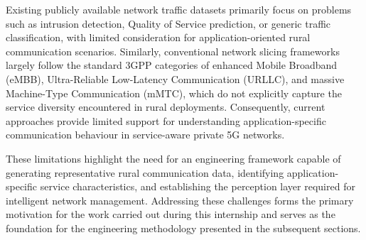 \documentclass[12pt,a4paper]{report}
\begin{document}
	Existing publicly available network traffic datasets primarily focus on problems such as intrusion detection, Quality of Service prediction, or generic traffic classification, with limited consideration for application-oriented rural communication scenarios. Similarly, conventional network slicing frameworks largely follow the standard 3GPP categories of enhanced Mobile Broadband (eMBB), Ultra-Reliable Low-Latency Communication (URLLC), and massive Machine-Type Communication (mMTC), which do not explicitly capture the service diversity encountered in rural deployments. Consequently, current approaches provide limited support for understanding application-specific communication behaviour in service-aware private 5G networks.
	
	These limitations highlight the need for an engineering framework capable of generating representative rural communication data, identifying application-specific service characteristics, and establishing the perception layer required for intelligent network management. Addressing these challenges forms the primary motivation for the work carried out during this internship and serves as the foundation for the engineering methodology presented in the subsequent sections.
	
\end{document}
